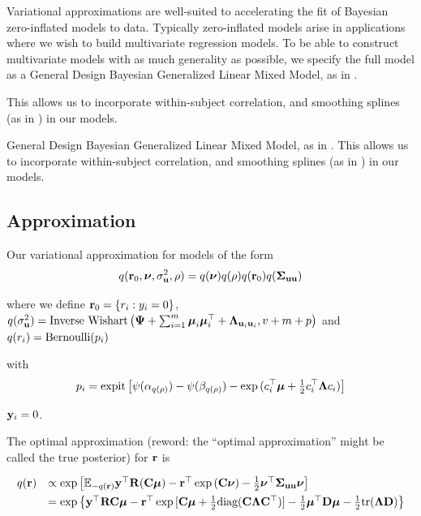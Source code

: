 \documentclass[times, doublespace]{anzsauth}
\newcommand{\joc}[1]{{\color{red}#1}}
\begin{document}
Variational approximations are well-suited to accelerating the fit of Bayesian zero-inflated models to data.
Typically zero-inflated models arise in applications where we wish to build multivariate regression models. To
be able to construct multivariate models with as much generality as possible, we specify the full model as a
General Design Bayesian Generalized Linear Mixed Model, as in \cite{zhao06}.

\noindent This allows us to incorporate within-subject correlation, and smoothing splines (as in
\cite{Wand2008}) in our models.

General Design Bayesian Generalized Linear Mixed Model, as in \cite{zhao06}. This allows us to incorporate
within-subject correlation, and smoothing splines (as in \cite{Wand2008}) in our models.




\subsection{Approximation}

Our variational approximation for models of the form 
$$
q({\bf r}_0, {\boldsymbol \nu}, \sigma_{{\bf u}}^2, \rho) = q({\boldsymbol \nu})q(\rho) q({\bf r}_0)q({\boldsymbol \Sigma}_{{\bf u} {\bf u}})  \\
$$

\noindent 
where we define ${\bf r}_0 = \{ r_i : y_i = 0 \}$,
$q(\sigma_{{\bf u}}^2) = \mbox{Inverse Wishart}\left({\boldsymbol \Psi} + \sum_{i=1}^m {\boldsymbol \mu}_i {\boldsymbol \mu}_i^\top + {\boldsymbol \Lambda}_{{\bf u}_i {\bf u}_i}, v + m + 
p\right)$ \mbox{and } $q(r_i) = \text{Bernoulli} (p_i)$

\noindent 
with
$$
p_i = \text{expit} \left[ \psi{(\alpha_{q(\rho)})} - \psi{(\beta_{q(\rho)})} - \exp{(c_i^\top{\boldsymbol\mu}+  \tfrac{1}{2} c_i^\top {\boldsymbol\Lambda}c_i)} \right]
$$

\noindent 
{} ${\bf y}_i = 0$.


\noindent The optimal approximation \joc{(reword: the ``optimal approximation'' might be called the true posterior)} for ${\bf r}$ is


$$
\begin{array}{rl}
	q({\bf r}) & \propto \exp \left [ {\mathbb E}_{-q({\bf r})}{\bf y}^\top{\bf R}({\bf C}{\boldsymbol \mu}) - {\bf r}^\top\exp{({\bf C}{\boldsymbol\nu})}-\tfrac{1}{2} {\boldsymbol \nu}^\top {\boldsymbol\Sigma}_{{\bf u} {\bf u}} {\boldsymbol \nu} \right ]                                                  \\ [1ex]
	       & = \exp{ \left\{ {\bf y}^\top{\bf R}{\bf C}{\boldsymbol\mu}- {\bf r}^\top \exp{[{\bf C}{\boldsymbol\mu}+  \tfrac{1}{2} \text{diag}({\bf C}{\boldsymbol\Lambda}{\bf C}^\top)]} -  \tfrac{1}{2} {\boldsymbol\mu}^\top {\bf D}{\boldsymbol\mu}-  \tfrac{1}{2} \text{tr}({\boldsymbol\Lambda}{\bf D}) \right\} } 
\end{array}
$$
\end{document}
